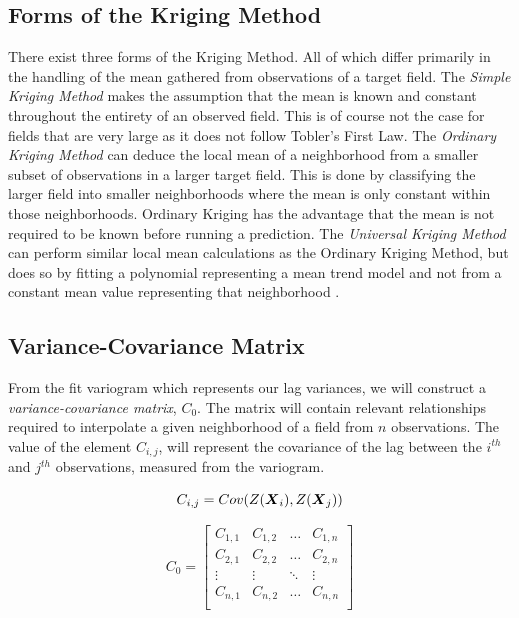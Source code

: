 \documentclass[11pt]{ucthesis}
\newcommand{\vect}[1]{{\it{\boldsymbol{#1}}}}
\begin{document}
\subsection{Forms of the Kriging Method}
There exist three forms of the Kriging Method. All of which differ primarily in the handling of the mean gathered from observations of a target field. The \textit{Simple Kriging Method} makes the assumption that the mean is known and constant throughout the entirety of an observed field. This is of course not the case for fields that are very large as it does not follow Tobler's First Law. The \textit{Ordinary Kriging Method} can deduce the local mean of a neighborhood from a smaller subset of observations in a larger target field. This is done by classifying the larger field into smaller neighborhoods where the mean is only constant within those neighborhoods. Ordinary Kriging has the advantage that the mean is not required to be known before running a prediction. The \textit{Universal Kriging Method} can perform similar local mean calculations as the Ordinary Kriging Method, but does so by fitting a polynomial representing a mean trend model and not from a constant mean value representing that neighborhood \cite{vandergraaf:nnkrig}.

\subsection{Variance-Covariance Matrix}
From the fit variogram which represents our lag variances, we will construct a \textit{variance-covariance matrix}, $C_0$. The matrix will contain relevant relationships required to interpolate a given neighborhood of a field from $n$ observations. The value of the element $C_{i,j}$, will represent the covariance of the lag between the $i^{th}$ and $j^{th}$ observations, measured from the variogram. 

\begin{equation}
    C_{i,j} = Cov(Z(\vect{X}_{i}), Z(\vect{X}_{j}))
    \label{eq:covvarmatelem}
\end{equation}

\begin{equation}
    C_0 = \begin{bmatrix} C_{1,1} & C_{1,2} & \dots & C_{1, n} \\
                        C_{2,1} & C_{2,2} & \dots & C_{2, n} \\
                         \vdots & \vdots & \ddots & \vdots  \\
                        C_{n,1} & C_{n,2} & \dots & C_{n,n} \\
        \end{bmatrix}
    \label{eq:covvarmat}
\end{equation}
\end{document}
